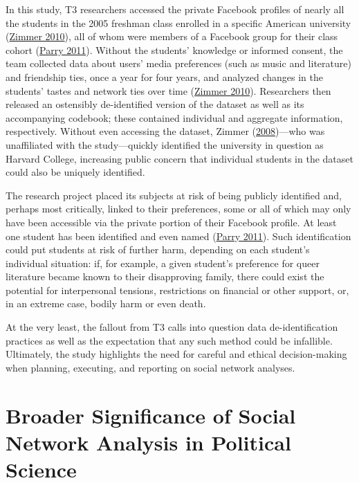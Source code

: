 \documentclass{book}
\begin{document}
In this study, T3 researchers accessed the private Facebook profiles of nearly
all the students in the 2005 freshman class enrolled in a specific American
university (\protect\hyperlink{ref-Zimmer2010}{Zimmer 2010}), all of whom were
members of a Facebook group for their class cohort
(\protect\hyperlink{ref-Parry2011}{Parry 2011}). Without the students'
knowledge or informed consent, the team collected data about users' media
preferences (such as music and literature) and friendship ties, once a year
for four years, and analyzed changes in the students' tastes and network ties
over time (\protect\hyperlink{ref-Zimmer2010}{Zimmer 2010}). Researchers then
released an ostensibly de-identified version of the dataset as well as its
accompanying codebook; these contained individual and aggregate information,
respectively. Without even accessing the dataset, Zimmer
(\protect\hyperlink{ref-Zimmer2008}{2008})---who was unaffiliated with the
study---quickly identified the university in question as Harvard College,
increasing public concern that individual students in the dataset could also
be uniquely identified.

The research project placed its subjects at risk of being publicly identified
and, perhaps most critically, linked to their preferences, some or all of
which may only have been accessible via the private portion of their Facebook
profile. At least one student has been identified and even named
(\protect\hyperlink{ref-Parry2011}{Parry 2011}). Such identification could put
students at risk of further harm, depending on each student's individual
situation: if, for example, a given student's preference for queer literature
became known to their disapproving family, there could exist the potential for
interpersonal tensions, restrictions on financial or other support, or, in an
extreme case, bodily harm or even death.

At the very least, the fallout from T3 calls into question data
de-identification practices as well as the expectation that any such method
could be infallible. Ultimately, the study highlights the need for careful and
ethical decision-making when planning, executing, and reporting on social
network analyses.

\hypertarget{broader-significance-of-social-network-analysis-in-political-science}{%
\section{Broader Significance of Social Network Analysis in Political
Science}\label{broader-significance-of-social-network-analysis-in-political-science}}
\end{document}
